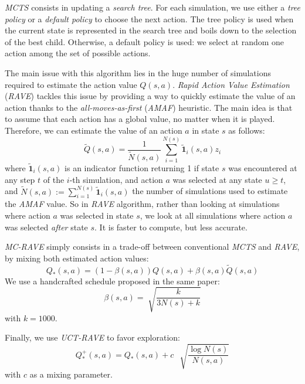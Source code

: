 \documentclass[journal, a4paper]{IEEEtran}
\begin{document}
\textit{MCTS} consists in updating a \textit{search tree}. For each simulation, we use either a \textit{tree policy} or a \textit{default policy} to choose the next action. The tree policy is used when the current state is represented in the search tree and boils down to the selection of the best child. Otherwise, a default policy is used: we select at random one action among the set of possible actions.

The main issue with this algorithm lies in the huge number of simulations required to estimate the action value $Q(s,a)$. \textit{Rapid Action Value Estimation} (\textit{RAVE}) \cite{mc-rave} tackles this issue by providing a way to quickly estimate the value of an action thanks to the \textit{all-moves-as-first} (\textit{AMAF}) heuristic. The main idea is that to assume that each action has a global value, no matter when it is played. Therefore, we can estimate the value of an action $a$ in state $s$ as follows:
$$\tilde Q(s,a) = \frac{1}{\tilde N(s,a)} \sum_{i=1}^{N(s)} \mathbf{\tilde 1}_{i}(s,a)z_i$$
where $\mathbf{\tilde 1}_{i}(s,a)$ is an indicator function returning 1 if state $s$ was encountered at any step $t$ of the $i$-th simulation, and action $a$ was selected at any state $u\geq t$, and $\tilde N(s,a):=\sum_{i=1}^{N(s)} \mathbf{\tilde 1}_{i}(s,a)$ the number of simulations used to estimate the \textit{AMAF} value. So in \textit{RAVE} algorithm, rather than looking at simulations where action $a$ was selected in state $s$, we look at all simulations where action $a$ was selected \textit{after} state $s$. It is faster to compute, but less accurate.

\textit{MC-RAVE} simply consists in a trade-off between conventional \textit{MCTS} and \textit{RAVE}, by mixing both estimated action values:
$$Q_*(s,a) = (1-\beta(s,a))Q(s,a) + \beta(s,a)\tilde Q(s,a)$$
We use a handcrafted schedule proposed in the same paper\cite{mc-rave}:
$$\beta(s,a) = \sqrt[]{\frac{k}{3N(s)+k}}$$
with $k=1000$.

Finally, we use \textit{UCT-RAVE} \cite{mc-rave} to favor exploration:
$$Q_*^+(s,a) = Q_*(s,a) + c\:\:\sqrt[]{\frac{\log N(s)}{N(s,a)}}$$
with $c$  as a mixing parameter.
\end{document}
